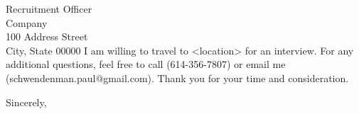 \documentclass[11pt]{letter} %
\begin{document}
\begin{letter}{Recruitment Officer \\
Company \\
100 Address Street\\
City, State 00000}
I am willing to travel to <location> for an interview.  For any additional
questions, feel free to call (614-356-7807) or email me
(schwendenman.paul@gmail.com).  Thank you for your time and consideration.

\closing{Sincerely,}




\end{letter}
\end{document}
